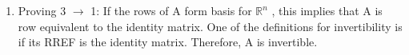 \documentclass{article}
\begin{document}
\begin{enumerate}
\begin{enumerate}
\item Proving 3 $\rightarrow$ 1: If the rows of A form basis for $\mathbb{R}^n$ , this implies that A is row equivalent to the identity matrix. One of the definitions for invertibility is if its RREF is the identity matrix. Therefore, A is invertible.

\end{enumerate}

\end{enumerate}
\end{document}
